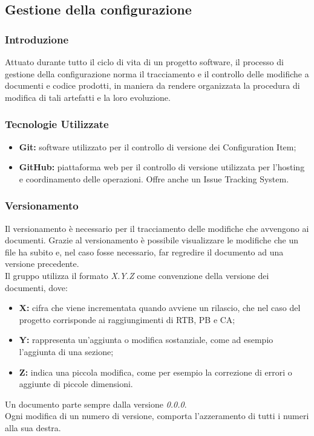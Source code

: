 \subsection{Gestione della configurazione}

\subsubsection{Introduzione}

Attuato durante tutto il ciclo di vita di un progetto software, il processo di gestione della configurazione norma il tracciamento e il controllo delle modifiche a documenti e codice prodotti, in maniera da rendere organizzata la procedura di modifica di tali artefatti e la loro evoluzione.

\subsubsection{Tecnologie Utilizzate}

\begin{itemize}
    \item \textbf{Git:} software utilizzato per il controllo di versione dei Configuration Item;
    \item \textbf{GitHub:} piattaforma web per il controllo di versione utilizzata per l'hosting e coordinamento delle operazioni. Offre anche un Issue Tracking System.
\end{itemize}

\subsubsection{Versionamento}

Il versionamento è necessario per il tracciamento delle modifiche che avvengono ai documenti. Grazie al versionamento è possibile visualizzare le modifiche che un file ha subito e, nel caso fosse necessario, far regredire il documento ad una versione precedente. \\
Il gruppo utilizza il formato \textit{X.Y.Z} come convenzione della versione dei documenti, dove:
\begin{itemize}
    \item \textbf{X:} cifra che viene incrementata quando avviene un rilascio, che nel caso del progetto corrisponde ai raggiungimenti di RTB, PB e CA;
    \item \textbf{Y:} rappresenta un'aggiunta o modifica sostanziale, come ad esempio l'aggiunta di una sezione;
    \item \textbf{Z:} indica una piccola modifica, come per esempio la correzione di errori o aggiunte di piccole dimensioni.
\end{itemize}
Un documento parte sempre dalla versione \textit{0.0.0}. \\
Ogni modifica di un numero di versione, comporta l'azzeramento di tutti i numeri alla sua destra.

